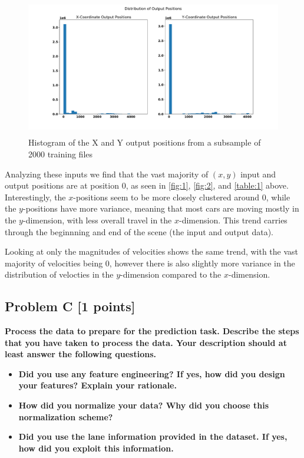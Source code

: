 \documentclass{article}
\begin{document}
    \begin{figure}[H]
        \centering
        \includegraphics[height=6cm]{figures/sample-out-position-hist.pdf}%
        \caption{Histogram of the X and Y output positions from a subsample of 2000 training files}%
        \label{fig:2}
    \end{figure}

    Analyzing these inputs we find that the vast majority of $(x,y)$ input and output positions are at position $0$, as seen in 
    \autoref{fig:1}, \autoref{fig:2}, and \autoref{table:1} above. Interestingly, the $x$-positions seem to be 
    more closely clustered around $0$, while the $y$-positions 
    have more variance, meaning that most cars are moving mostly in the $y$-dimension, with less overall travel in the $x$-dimension. This
    trend carries through the beginnning and end of the scene (the input and output data).
    
    Looking at only the magnitudes of velocities shows the same trend, with the vast majority of velocities being
    0, however there is also slightly more variance in the distribution of velocties in the $y$-dimension compared to 
    the $x$-dimension.
    
    \subsection{Problem C [1 points]}
      \textbf{Process the data to prepare for the prediction task. Describe the
      steps that you have taken to process the data. Your description should at least answer the
      following questions.}
      
      \begin{itemize}
        \item \textbf{Did you use any feature engineering? If yes, how did you design your features?
        Explain your rationale.}
        \item \textbf{How did you normalize your data? Why did you choose this normalization scheme?}
        \item \textbf{Did you use the lane information provided in the dataset. If yes, how did you
        exploit this information.}
      \end{itemize}
\end{document}
